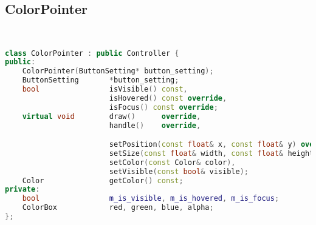 \subsection{ColorPointer}
\begin{lstlisting}[language=C++]


class ColorPointer : public Controller {
public:
    ColorPointer(ButtonSetting* button_setting);
    ButtonSetting       *button_setting;
    bool                isVisible() const,
                        isHovered() const override,
                        isFocus() const override;
    virtual void        draw()      override,
                        handle()    override,

                        setPosition(const float& x, const float& y) override,
                        setSize(const float& width, const float& height) override,
                        setColor(const Color& color),
                        setVisible(const bool& visible);
    Color               getColor() const;
private:
    bool                m_is_visible, m_is_hovered, m_is_focus;
    ColorBox            red, green, blue, alpha;
};






\end{lstlisting}
